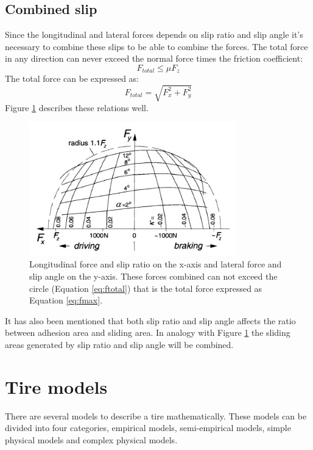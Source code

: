 \subsection{Combined slip}
Since the longitudinal and lateral forces depends on slip ratio and slip angle it's necessary to combine these slips to be able to combine the forces. The total force in any direction can never exceed the normal force times the friction coefficient:
\begin{equation}
F_{total} \leq \mu F_{z}
\label{eq:fmax}
\end{equation}
The total force can be expressed as:
\begin{equation}
F_{total} = \sqrt{F_{x}^{2}+F_{y}^{2}}
\label{eq:ftotal}
\end{equation}
Figure \ref{combined} describes these relations well.
\begin{figure}[h]
	\centering
	\includegraphics[width=0.8\textwidth]{Pictures/combined}
	\caption{Longitudinal force and slip ratio on the x-axis and lateral force and slip angle on the y-axis. These forces combined can not exceed the circle (Equation \ref{eq:ftotal}) that is the total force expressed as Equation \ref{eq:fmax}. \cite{pacejka}}
	\label{combined}
\end{figure}
It has also been mentioned that both slip ratio and slip angle affects the ratio between adhesion area and sliding area. In analogy with Figure \ref{combined} the sliding areas generated by slip ratio and slip angle will be combined.
\section{Tire models}
There are several models to describe a tire mathematically. These models can be divided into four categories, empirical models, semi-empirical models, simple physical models and complex physical  models. 

